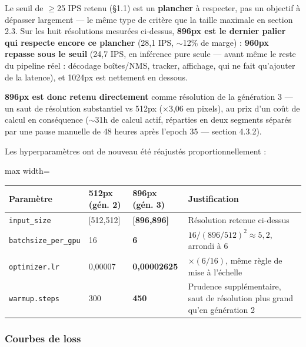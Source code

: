 \documentclass[11pt,a4paper]{article}
\let\Oldsubsubsection\subsubsection
\renewcommand{\subsubsection}{\FloatBarrier\Oldsubsubsection}
\begin{document}
    
    Le seuil de $\geq$25 IPS retenu (\S 1.1) est un \textbf{plancher} à
    respecter, pas un objectif à dépasser largement --- le même
    type de critère que la taille maximale en section 2.3. Sur les huit résolutions mesurées ci-dessus, \textbf{896px est
    le dernier palier qui respecte encore ce plancher} (28,1 IPS,
    $\sim$12\% de marge) : \textbf{960px repasse sous le seuil} (24,7
    IPS, en inférence pure seule --- avant même le reste du pipeline réel :
    décodage boîtes/NMS, tracker, affichage, qui ne fait qu'ajouter de la
    latence), et 1024px est nettement en dessous.
    
    \textbf{896px est donc retenu directement} comme résolution de la
    génération 3 --- un saut de résolution substantiel vs 512px
    ($\times$3,06 en pixels), au prix d'un
    coût de calcul en conséquence ($\sim$31h de calcul actif, réparties en
    deux segments séparés par une pause manuelle de 48 heures après l'epoch
    35 --- section 4.3.2).
    
    Les hyperparamètres ont de nouveau été réajustés proportionnellement :
    
    \begin{table}[!htbp]
    \centering
    \small
    \begin{adjustbox}{max width=\linewidth}
    \begin{tabular}{@{}p{3.4cm}p{2.2cm}p{2.2cm}p{6.8cm}@{}}
    \toprule
    \textbf{Paramètre} & \textbf{512px (gén. 2)} & \textbf{896px (gén. 3)} & \textbf{Justification} \\
    \midrule
    \texttt{input\_size} & [512,512] & \textbf{[896,896]} & Résolution retenue ci-dessus \\
    \texttt{batchsize\_per\_gpu} & 16 & \textbf{6} & $16/(896/512)^2\approx5{,}2$, arrondi à 6 \\
    \texttt{optimizer.lr} & 0,00007 & \textbf{0,00002625} & $\times(6/16)$, même règle de mise à l'échelle \\
    \texttt{warmup.steps} & 300 & \textbf{450} & Prudence supplémentaire, saut de résolution plus grand qu'en génération 2 \\
    \bottomrule
    \end{tabular}
    \end{adjustbox}
    \end{table}
    
    \subsubsection{Courbes de loss}
    
\end{document}
